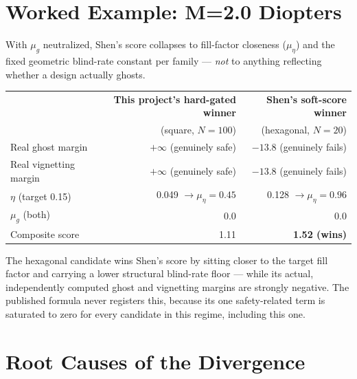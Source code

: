 \section{Worked Example: M=2.0 Diopters}

With $\mu_g$ neutralized, Shen's score collapses to fill-factor closeness
($\mu_\eta$) and the fixed geometric blind-rate constant per family --- \emph{not}
to anything reflecting whether a design actually ghosts.

\begin{center}
\begin{tabular}{lrr}
\toprule
& \textbf{This project's hard-gated winner} & \textbf{Shen's soft-score winner} \\
& (square, $N{=}100$) & (hexagonal, $N{=}20$) \\
\midrule
Real ghost margin & $+\infty$ (genuinely safe) & $-13.8$ (genuinely fails) \\
Real vignetting margin & $+\infty$ (genuinely safe) & $-13.8$ (genuinely fails) \\
$\eta$ (target 0.15) & 0.049 $\to \mu_\eta=0.45$ & 0.128 $\to \mu_\eta=0.96$ \\
$\mu_g$ (both) & 0.0 & 0.0 \\
Composite score & 1.11 & \textbf{1.52 (wins)} \\
\bottomrule
\end{tabular}
\end{center}

The hexagonal candidate wins Shen's score by sitting closer to the target
fill factor and carrying a lower structural blind-rate floor --- while its
actual, independently computed ghost and vignetting margins are strongly
negative. The published formula never registers this, because its one
safety-related term is saturated to zero for every candidate in this
regime, including this one.

\section{Root Causes of the Divergence}

